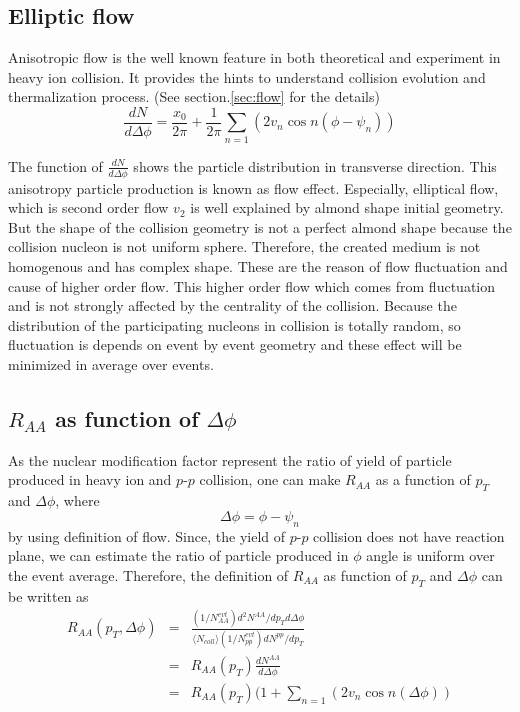 	\subsection{Elliptic flow}
	Anisotropic flow is the well known feature in both theoretical and experiment in heavy ion collision. It provides the hints to understand collision evolution and thermalization process. (See section.\ref{sec:flow} for the details)
	\smallskip
 \begin{equation}
 \frac{dN}{d\Delta\phi}=\frac{x_0}{2\pi}+\frac{1}{2\pi}\sum_{n=1}{(2v_n\cos{n(\phi-\psi_n)})}
\end{equation} 
	\smallskip

The function of $\frac{dN}{d\Delta\phi}$ shows  the particle distribution in transverse direction.  This anisotropy particle production is known as flow effect. Especially, elliptical flow, which is second order flow $v_2$ is well explained by almond shape initial geometry. But the shape of the collision geometry is not a perfect almond shape because the collision nucleon is not uniform sphere. Therefore, the created medium is not homogenous and has complex shape.  These are the reason of flow fluctuation and cause of higher order flow. This higher order flow which comes from fluctuation and is not strongly affected by the centrality of the collision. Because the distribution of the participating nucleons in collision is totally random, so fluctuation is depends on event by event geometry and these effect will be minimized in average over events. 

	\subsection{$R_{AA}$ as function of $\Delta\phi$}
	  As the nuclear modification factor represent the ratio of yield of particle produced in heavy ion and $p$-$p$ collision, one can make $R_{AA}$ as a function of $p_T$ and $\Delta \phi$, where $$ \Delta \phi  = \phi - \psi_{n}$$ by using definition of flow. Since, the yield of $p$-$p$ collision does not have reaction plane, we can estimate the ratio of particle produced in $\phi$ angle is uniform over the event average. Therefore, the definition of $R_{AA}$ as function of $p_T$ and $\Delta \phi$ can be written as \cite{Liao:2009ni, Adler:2006bw}
    \begin{eqnarray}
  R_{AA}(p_{T}, \Delta \phi) &=& \frac{(1/N^{evt}_{AA})d^2N^{AA}/dp_{T} d\Delta\phi}{ \langle N_{coll}\rangle(1/N^{evt}_{pp})dN^{pp}/dp_{T}}\\
  &=& {R_{AA}(p_T)}\frac{dN^{AA}}{d\Delta\phi}\\
  &=& {R_{AA}(p_T)}(1+\sum_{n=1}{(2v_n\cos{n(\Delta \phi)})}
  \end {eqnarray}
\smallskip

